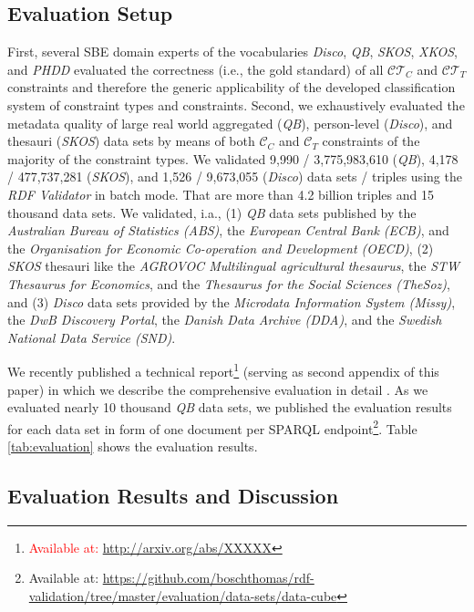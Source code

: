 \documentclass{llncs}
\begin{document}
{\subsection{Evaluation Setup}

First, several SBE domain experts of the vocabularies \emph{Disco}, \emph{QB}, \emph{SKOS}, \emph{XKOS}, and \emph{PHDD} evaluated the correctness (i.e., the gold standard) of all $\mathcal{CT}_{C}$ and $\mathcal{CT}_{T}$ constraints and therefore the generic applicability of the developed classification system of constraint types and constraints. 
Second, we exhaustively evaluated the metadata quality of large real world aggregated (\emph{QB}), person-level (\emph{Disco}), and thesauri (\emph{SKOS}) data sets by means of both $\mathcal{C}_{C}$ and $\mathcal{C}_{T}$ constraints of the majority of the constraint types.
We validated 
9,990 / 3,775,983,610 (\emph{QB}),
4,178 / 477,737,281 (\emph{SKOS}), and 
1,526 / 9,673,055 (\emph{Disco}) data sets / triples using the \emph{RDF Validator} in batch mode.
That are more than 4.2 billion triples and 15 thousand data sets.
We validated, i.a., 
(1) \emph{QB} data sets published by the \emph{Australian Bureau of Statistics (ABS)},
the \emph{European Central Bank (ECB)}, and the
\emph{Organisation for Economic Co-operation and Development (OECD)},
(2) \emph{SKOS} thesauri like the \emph{AGROVOC Multilingual agricultural thesaurus},
the \emph{STW Thesaurus for Economics}, and the
\emph{Thesaurus for the Social Sciences (TheSoz)}, and
(3) \emph{Disco} data sets provided by the \emph{Microdata Information System (Missy)}, 
the \emph{DwB Discovery Portal}, the
\emph{Danish Data Archive (DDA)}, and the
\emph{Swedish National Data Service (SND)}.

We recently published a technical report\footnote{\label{technical-report-2}\textcolor{red}{Available at: \url{http://arxiv.org/abs/XXXXX}}} (serving as second appendix of this paper) 
in which we describe the comprehensive evaluation in detail \cite{BoschZapilkoWackerowEckert2015-2}. 
As we evaluated nearly 10 thousand \emph{QB} data sets, we published the evaluation results for each data set in form of one document per SPARQL endpoint\footnote{Available at: \url{https://github.com/boschthomas/rdf-validation/tree/master/evaluation/data-sets/data-cube}}.
Table \ref{tab:evaluation} shows the evaluation results.

\subsection{Evaluation Results and Discussion}

}
\end{document}

